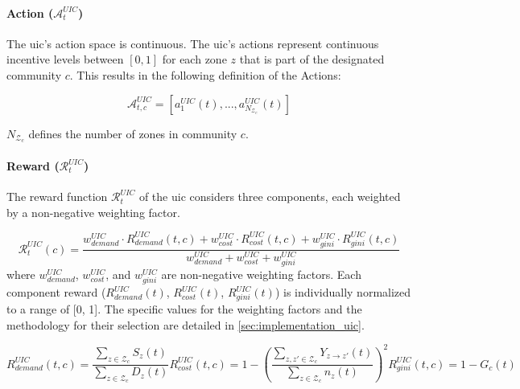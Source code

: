 \paragraph{Action ($\mathcal{A}^{UIC}_t$)}
The \gls{uic}'s action space is continuous.
The \gls{uic}'s actions represent continuous incentive levels between $[0,1]$ for each zone $z$ that is part of the designated community $c$.
This results in the following definition of the Actions:

\begin{equation}
    \mathcal{A}^{UIC}_{t, c} = [a_1^{UIC}(t), ..., a_{N_{\mathcal{Z}_c}}^{UIC}(t)]
\end{equation}

$N_{\mathcal{Z}_c}$ defines the number of zones in community $c$.



\paragraph{Reward ($\mathcal{R}^{UIC}_t$)}

The reward function $\mathcal{R}^{UIC}_t$ of the \gls{uic} considers three components, each weighted by a non-negative weighting factor.

\begin{equation}\label{eq:uic-reward}
    \mathcal{R}^{UIC}_t(c) = \frac{w_{demand}^{UIC} \cdot R_{demand}^{UIC}(t, c) + w_{cost}^{UIC} \cdot R_{cost}^{UIC}(t, c) + w_{gini}^{UIC} \cdot R_{gini}^{UIC}(t, c)}{w_{demand}^{UIC}+ w_{cost}^{UIC}+ w_{gini}^{UIC}}
\end{equation}
where $w_{demand}^{UIC}$, $w_{cost}^{UIC}$, and $w_{gini}^{UIC}$ are non-negative weighting factors. Each component reward ($R_{demand}^{UIC}(t)$, $R_{cost}^{UIC}(t)$, $R_{gini}^{UIC}(t)$) is individually normalized to a range of [0, 1].
The specific values for the weighting factors and the methodology for their selection are detailed in \autoref{sec:implementation_uic}.

\begin{subequations}
    \begin{equation}\label{eq:uic-reward-demand}
        R_{demand}^{UIC}(t, c) = \frac{\sum_{z \in \mathcal{Z}_c}S_z(t)}{\sum_{z \in \mathcal{Z}_c}D_z(t)}
    \end{equation}
    \begin{equation}\label{eq:uic-reward-cost}
        R_{cost}^{UIC}(t, c) = 1 -  \left(\frac{\sum_{z, z' \in \mathcal{Z}_c}Y_{z \to z'}(t)}{\sum_{z \in \mathcal{Z}_c}n_z(t)}\right)^2
    \end{equation}
    \begin{equation}\label{eq:uic-reward-gini}
        R_{gini}^{UIC}(t, c) = 1 - G_c(t)
    \end{equation}
\end{subequations}

